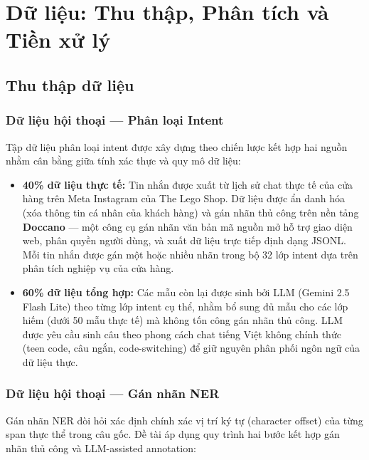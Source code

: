 \documentclass[12pt, a4paper]{report}
\begin{document}
\chapter{Dữ liệu: Thu thập, Phân tích và Tiền xử lý}

\section{Thu thập dữ liệu}

\subsection{Dữ liệu hội thoại --- Phân loại Intent}

Tập dữ liệu phân loại intent được xây dựng theo chiến lược kết hợp
hai nguồn nhằm cân bằng giữa tính xác thực và quy mô dữ liệu:

\begin{itemize}
  \item \textbf{40\% dữ liệu thực tế:} Tin nhắn được xuất từ lịch sử
        chat thực tế của cửa hàng trên Meta Instagram của The Lego Shop.
        Dữ liệu được ẩn danh hóa (xóa thông tin cá nhân của khách hàng)
        và gán nhãn thủ công trên nền tảng \textbf{Doccano} \cite{doccano2018}
        --- một công cụ gán nhãn văn bản mã nguồn mở hỗ trợ giao diện web,
        phân quyền người dùng, và xuất dữ liệu trực tiếp định dạng JSONL.
        Mỗi tin nhắn được gán một hoặc nhiều nhãn trong bộ 32 lớp intent
        dựa trên phân tích nghiệp vụ của cửa hàng.

  \item \textbf{60\% dữ liệu tổng hợp:} Các mẫu còn lại được sinh bởi LLM
        (Gemini 2.5 Flash Lite) theo từng lớp intent cụ thể, nhằm bổ sung
        đủ mẫu cho các lớp hiếm (dưới 50 mẫu thực tế) mà không tốn công
        gán nhãn thủ công. LLM được yêu cầu sinh câu theo phong cách chat
        tiếng Việt không chính thức (teen code, câu ngắn, code-switching)
        để giữ nguyên phân phối ngôn ngữ của dữ liệu thực.
\end{itemize}

\subsection{Dữ liệu hội thoại --- Gán nhãn NER}
\label{subsec:ner_annotation}

Gán nhãn NER đòi hỏi xác định chính xác vị trí ký tự (character offset)
của từng span thực thể trong câu gốc. Đề tài áp dụng quy trình hai bước
kết hợp gán nhãn thủ công và LLM-assisted annotation:
\end{document}
